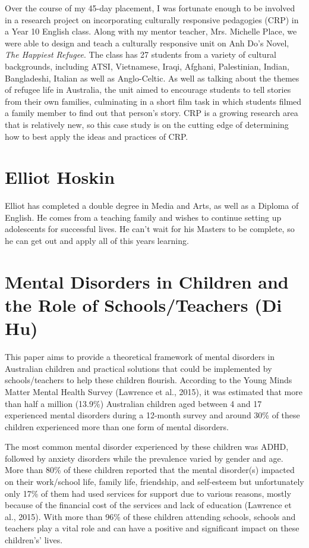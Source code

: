 \documentclass[twoside,12pt,a4paper,notitlepage]{memoir}
\begin{document}
Over the course of my 45-day placement, I was fortunate enough to be involved in a research project on incorporating culturally responsive pedagogies (CRP) in a Year 10 English class. Along with my mentor teacher, Mrs. Michelle Place, we were able to design and teach a culturally responsive unit on Anh Do’s Novel, \textit{The Happiest Refugee}. The class has 27 students from a variety of cultural backgrounds, including ATSI, Vietnamese, Iraqi, Afghani, Palestinian, Indian, Bangladeshi, Italian as well as Anglo-Celtic. As well as talking about the themes of refugee life in Australia, the unit aimed to encourage students to tell stories from their own families, culminating in a short film task in which students filmed a family member to find out that person’s story. CRP is a growing research area that is relatively new, so this case study is on the cutting edge of determining how to best apply the ideas and practices of CRP.

\section*{Elliot Hoskin}

Elliot has completed a double degree in Media and Arts, as well as a Diploma of English. He comes from a teaching family and wishes to continue setting up adolescents for successful lives. He can’t wait for his Masters to be complete, so he can get out and apply all of this years learning.



\pagebreak
\section*{Mental Disorders in Children and the Role of Schools/Teachers (Di Hu)}
\label{aut:hu}

This paper aims to provide a theoretical framework of mental disorders in Australian children and practical solutions that could be implemented by schools/teachers to help these children flourish. According to the Young Minds Matter Mental Health Survey (Lawrence et al., 2015), it was estimated that more than half a million (13.9\%) Australian children aged between 4 and 17 experienced mental disorders during a 12-month survey and around 30\% of these children experienced more than one form of mental disorders. 


The most common mental disorder experienced by these children was ADHD, followed by anxiety disorders while the prevalence varied by gender and age. More than 80\% of these children reported that the mental disorder(s) impacted on their work/school life, family life, friendship, and self-esteem but unfortunately only 17\% of them had used services for support due to various reasons, mostly because of the financial cost of the services and lack of education (Lawrence et al., 2015). With more than 96\% of these children attending schools, schools and teachers play a vital role and can have a positive and significant impact on these children’s’ lives.
\end{document}
